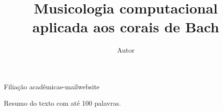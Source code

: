 \documentclass[brazil]{article}
\begin{document}
\graphicspath{{figs/}}

\title{Musicologia computacional aplicada aos corais de Bach}
\author{Autor}{Filiação acadêmica}{e-mail}{website}

\begin{sumario}
  Resumo do texto com até 100 palavras.  
\end{sumario}






\end{document}
